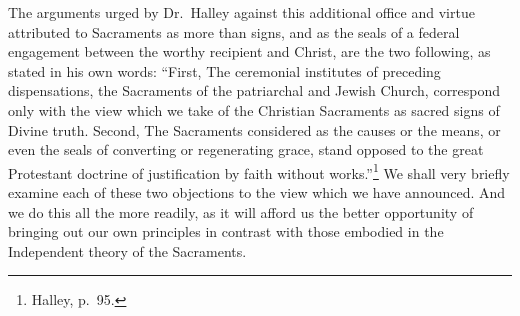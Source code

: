 \documentclass[
  english,
]{book}
\begin{document}
The arguments urged by Dr.~Halley against this additional office and virtue attributed to Sacraments as more than signs, and as the seals of a federal engagement between the worthy recipient and Christ, are the two following, as stated in his own words: ``First, The ceremonial institutes of preceding dispensations, the Sacraments of the patriarchal and Jewish Church, correspond only with the view which we take of the Christian Sacraments as sacred signs of Divine truth. Second, The Sacraments considered as the causes or the means, or even the seals of converting or regenerating grace, stand opposed to the great Protestant doctrine of justification by faith without works.''\footnote{Halley, p.~95.} We shall very briefly examine each of these two objections to the view which we have announced. And we do this all the more readily, as it will afford us the better opportunity of bringing out our own principles in contrast with those embodied in the Independent theory of the Sacraments.
\end{document}
